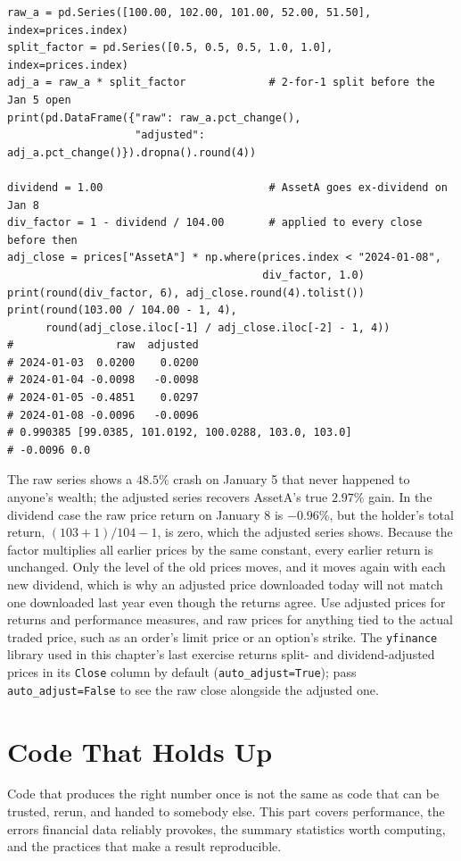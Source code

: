 \documentclass[../ai_in_finance]{subfiles}
\begin{document}
\begin{verbatim}
raw_a = pd.Series([100.00, 102.00, 101.00, 52.00, 51.50], index=prices.index)
split_factor = pd.Series([0.5, 0.5, 0.5, 1.0, 1.0], index=prices.index)
adj_a = raw_a * split_factor             # 2-for-1 split before the Jan 5 open
print(pd.DataFrame({"raw": raw_a.pct_change(),
                    "adjusted": adj_a.pct_change()}).dropna().round(4))

dividend = 1.00                          # AssetA goes ex-dividend on Jan 8
div_factor = 1 - dividend / 104.00       # applied to every close before then
adj_close = prices["AssetA"] * np.where(prices.index < "2024-01-08",
                                        div_factor, 1.0)
print(round(div_factor, 6), adj_close.round(4).tolist())
print(round(103.00 / 104.00 - 1, 4),
      round(adj_close.iloc[-1] / adj_close.iloc[-2] - 1, 4))
#                raw  adjusted
# 2024-01-03  0.0200    0.0200
# 2024-01-04 -0.0098   -0.0098
# 2024-01-05 -0.4851    0.0297
# 2024-01-08 -0.0096   -0.0096
# 0.990385 [99.0385, 101.0192, 100.0288, 103.0, 103.0]
# -0.0096 0.0
\end{verbatim}

The raw series shows a $48.5\%$ crash on January 5 that never happened to anyone's wealth; the adjusted series recovers AssetA's true $2.97\%$ gain. In the dividend case the raw price return on January 8 is $-0.96\%$, but the holder's total return, $(103 + 1)/104 - 1$, is zero, which the adjusted series shows. Because the factor multiplies all earlier prices by the same constant, every earlier return is unchanged. Only the level of the old prices moves, and it moves again with each new dividend, which is why an adjusted price downloaded today will not match one downloaded last year even though the returns agree. Use adjusted prices for returns and performance measures, and raw prices for anything tied to the actual traded price, such as an order's limit price or an option's strike. The \texttt{yfinance} library used in this chapter's last exercise returns split- and dividend-adjusted prices in its \texttt{Close} column by default (\texttt{auto\_adjust=True}); pass \texttt{auto\_adjust=False} to see the raw close alongside the adjusted one.

\section{Code That Holds Up}

Code that produces the right number once is not the same as code that can be trusted, rerun, and handed to somebody else. This part covers performance, the errors financial data reliably provokes, the summary statistics worth computing, and the practices that make a result reproducible.
\end{document}
